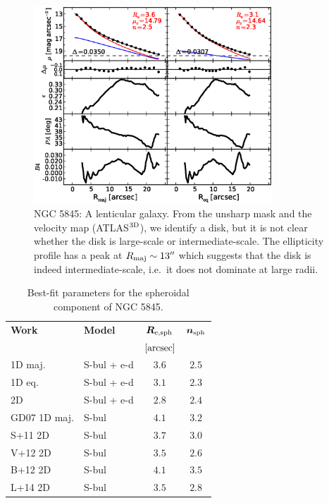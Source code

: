 \documentclass[preprint2]{emulateapj}
\newcommand{\fitfigurewidth}{0.8\textwidth}
\begin{document}
  \begin{figure}[h]
  \begin{center}
  \includegraphics[width=\fitfigurewidth]{n5845_1Dfit.eps}
  \caption{NGC 5845: 
  A lenticular galaxy. 
  From the unsharp mask and the velocity map (ATLAS$^{\rm 3D}$), we identify a disk, but it is not clear whether the disk is large-scale or intermediate-scale.
  The ellipticity profile has a peak at $R_{\rm maj} \sim 13''$ which suggests that the disk is indeed intermediate-scale, 
  i.e.~it does not dominate at large radii.
  }
  \end{center}
  \end{figure}

  \begin{table}[h]
  \small
  \caption{Best-fit parameters for the spheroidal component of NGC 5845.}
  \begin{center}
  \begin{tabular}{llcc}
  \hline
  {\bf Work} & {\bf Model}   & $\bm R_{\rm e,sph}$    & $\bm n_{\rm sph}$ \\
    &  &  $[\rm arcsec]$ & \\
  \hline
  1D maj. & S-bul + e-d & $3.6$  &  $2.5$ \\
  1D eq.  & S-bul + e-d & $3.1$  &  $2.3$ \\
  2D      & S-bul + e-d & $2.8$  &  $2.4$ \\
  \hline
  GD07 1D maj.      & S-bul & $4.1$  &  $3.2$ \\
  S+11 2D      & S-bul & $3.7$  &  $3.0$ \\
  V+12 2D      & S-bul & $3.5$  &  $2.6$ \\
  B+12 2D      & S-bul & $4.1$  &  $3.5$ \\
  L+14 2D      & S-bul & $3.5$  &  $2.8$ \\
  \hline
  \end{tabular}
  \end{center}
  \label{tab:n5845}
  \end{table}
\end{document}
